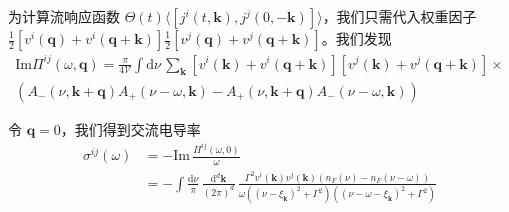 为计算流响应函数 $\Theta(t)\langle[j^i(t,\pmb{k}),j^j(0,-\pmb{k})]\rangle$，我们只需代入权重因子 $\frac{1}{2}[v^i(\pmb{q})+v^i(\pmb{q}+\pmb{k})]\frac{1}{2}[v^j(\pmb{q})+v^j(\pmb{q}+\pmb{k})]$。我们发现
\begin{align*}
\mathrm{Im}\Pi^{ij}(\omega,\pmb{q}) = \frac{\pi}{4\mathcal{V}}\int \mathrm{d}\nu\, \sum_{\pmb{k}} \left[v^i(\pmb{k})+v^i(\pmb{q}+\pmb{k})\right]\left[v^j(\pmb{k})+v^j(\pmb{q}+\pmb{k})\right]\times\\
\left(A_-(\nu,\pmb{k}+\pmb{q})A_+(\nu-\omega,\pmb{k}) - A_+(\nu,\pmb{k}+\pmb{q})A_-(\nu-\omega,\pmb{k})\right)
\end{align*}

令 $\pmb{q}=0$，我们得到交流电导率
\begin{align*}
\sigma^{ij}(\omega) &= -\mathrm{Im}\,\frac{\Pi^{ij}(\omega,0)}{\omega}\\
&= -\int \frac{\mathrm{d}\nu}{\pi}\, \frac{\mathrm{d}^d\pmb{k}}{(2\pi)^d}\, \frac{\Gamma^2 v^i(\pmb{k})v^j(\pmb{k})\left(n_F(\nu)-n_F(\nu-\omega)\right)}{\omega\left((\nu-\xi_{\pmb{k}})^2+\Gamma^2\right)\left((\nu-\omega-\xi_{\pmb{k}})^2+\Gamma^2\right)}
\end{align*}
